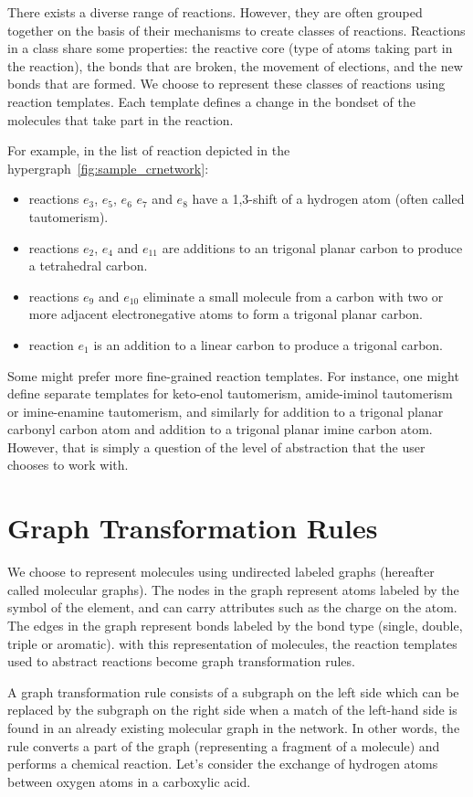 There exists a diverse range of reactions. However, they are often grouped together on the basis of their mechanisms to create classes of reactions. Reactions in a class share some properties: the reactive core (type of atoms taking part in the reaction), the bonds that are broken, the movement of elections, and the new bonds that are formed. We choose to represent these classes of reactions using reaction templates. Each template defines a change in the bondset of the molecules that take part in the reaction.

For example, in the list of reaction depicted in the hypergraph~\ref{fig:sample_crnetwork}:
\begin{itemize}
    \item reactions $e_3$, $e_5$, $e_6$ $e_7$ and $e_8$ have a 1,3-shift of a hydrogen atom (often called tautomerism).
    \item reactions $e_2$, $e_4$ and $e_{11}$ are additions to an trigonal planar carbon to produce a tetrahedral carbon.
    \item reactions $e_9$ and $e_{10}$ eliminate a small molecule from a carbon with two or more adjacent electronegative atoms to form a trigonal planar carbon.
    \item reaction $e_1$ is an addition to a linear carbon to produce a trigonal carbon.
\end{itemize}
Some might prefer more fine-grained reaction templates. For instance, one might define separate templates for keto-enol tautomerism, amide-iminol tautomerism or imine-enamine tautomerism, and similarly for addition to a trigonal planar carbonyl carbon atom and addition to a trigonal planar imine carbon atom. However, that is simply a question of the level of abstraction that the user chooses to work with.

\section{Graph Transformation Rules}
We choose to represent molecules using undirected labeled graphs (hereafter called molecular graphs). The nodes in the graph represent atoms labeled by the symbol of the element, and can carry attributes such as the charge on the atom. The edges in the graph represent bonds labeled by the bond type (single, double, triple or aromatic). with this representation of molecules, the reaction templates used to abstract reactions become graph transformation rules.

A graph transformation rule consists of a subgraph on the left side which can be replaced by the subgraph on the right side when a match of the left-hand side is found in an already existing molecular graph in the network. In other words, the rule converts a part of the graph (representing a fragment of a molecule) and performs a chemical reaction. Let's consider the exchange of hydrogen atoms between oxygen atoms in a carboxylic acid.

